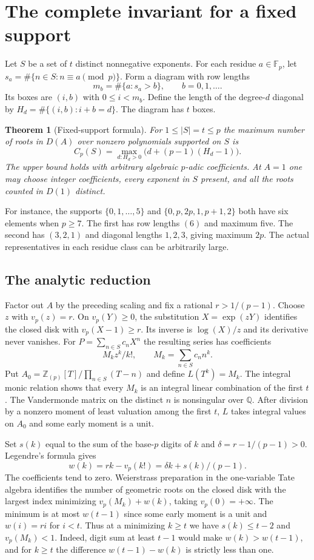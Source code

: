 \documentclass[11pt]{article}
\newtheorem{theorem}{Theorem}
\newcommand{\F}{\mathbb F}
\newcommand{\Z}{\mathbb Z}
\newcommand{\Q}{\mathbb Q}
\newcommand{\ord}{v_p}
\begin{document}
\section{The complete invariant for a fixed support}
Let $S$ be a set of $t$ distinct nonnegative exponents. For each residue $a\in\F_p$, let $s_a=\#\{n\in S:n\equiv a\pmod p\}$. Form a diagram with row lengths
\[
 m_b=\#\{a:s_a>b\},\qquad b=0,1,\ldots.
\]
Its boxes are $(i,b)$ with $0\le i<m_b$. Define the length of the degree-$d$ diagonal by $H_d=\#\{(i,b):i+b=d\}$. The diagram has $t$ boxes.
\begin{theorem}[Fixed-support formula]\label{thm:fixed}
For $1\le |S|=t\le p$ the maximum number of roots in $D(A)$ over nonzero polynomials supported on $S$ is
\[
 C_p(S)=\max_{d:H_d>0}\bigl(d+(p-1)(H_d-1)\bigr).
\]
The upper bound holds with arbitrary algebraic $p$-adic coefficients. At $A=1$ one may choose integer coefficients, every exponent in $S$ present, and all the roots counted in $D(1)$ distinct.
\end{theorem}
For instance, the supports $\{0,1,\ldots,5\}$ and $\{0,p,2p,1,p+1,2\}$ both have six elements when $p\ge7$. The first has row lengths $(6)$ and maximum five. The second has $(3,2,1)$ and diagonal lengths $1,2,3$, giving maximum $2p$. The actual representatives in each residue class can be arbitrarily large.

\subsection*{The analytic reduction}
Factor out $A$ by the preceding scaling and fix a rational $r>1/(p-1)$. Choose $z$ with $\ord(z)=r$. On $\ord(Y)\ge0$, the substitution $X=\exp(zY)$ identifies the closed disk with $\ord(X-1)\ge r$. Its inverse is $\log(X)/z$ and its derivative never vanishes. For $P=\sum_{n\in S} c_n X^n$ the resulting series has coefficients
\[
 M_k z^k/k!,\qquad M_k=\sum_{n\in S} c_n n^k .
\]
Put $A_0=\Z_{(p)}[T]/\prod_{n\in S}(T-n)$ and define $L(T^k)=M_k$. The integral monic relation shows that every $M_k$ is an integral linear combination of the first $t$. The Vandermonde matrix on the distinct $n$ is nonsingular over $\Q$. After division by a nonzero moment of least valuation among the first $t$, $L$ takes integral values on $A_0$ and some early moment is a unit.

Set $s(k)$ equal to the sum of the base-$p$ digits of $k$ and $\delta=r-1/(p-1)>0$. Legendre's formula gives
\[
 w(k)=rk-\ord(k!)=\delta k+s(k)/(p-1).
\]
The coefficients tend to zero. Weierstrass preparation in the one-variable Tate algebra identifies the number of geometric roots on the closed disk with the largest index minimizing $\ord(M_k)+w(k)$, taking $\ord(0)=+\infty$. The minimum is at most $w(t-1)$ since some early moment is a unit and $w(i)=ri$ for $i<t$. Thus at a minimizing $k\ge t$ we have $s(k)\le t-2$ and $\ord(M_k)<1$. Indeed, digit sum at least $t-1$ would make $w(k)>w(t-1)$, and for $k\ge t$ the difference $w(t-1)-w(k)$ is strictly less than one.
\end{document}
